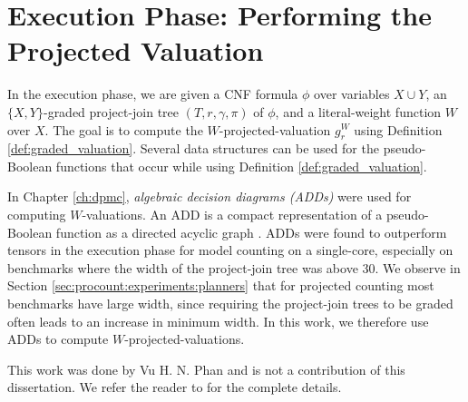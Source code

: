 \section{Execution Phase: Performing the Projected Valuation}
\label{sec:procount:execution}

In the execution phase, we are given a CNF formula $\phi$ over variables $X \cup Y$, an $\{X, Y\}$-graded project-join tree $(T, r, \gamma, \pi)$ of $\phi$, and a literal-weight function $W$ over $X$.
The goal is to compute the $W$-projected-valuation $g^W_r$ using Definition \ref{def:graded_valuation}.
Several data structures can be used for the pseudo-Boolean functions that occur while using Definition \ref{def:graded_valuation}.

In Chapter \ref{ch:dpmc}, \emph{algebraic decision diagrams (ADDs)} were used for computing $W$-valuations.
An ADD is a compact representation of a pseudo-Boolean function as a directed acyclic graph \cite{bahar1997algebraic}.
ADDs were found to outperform tensors in the execution phase for model counting on a single-core, especially on benchmarks where the width of the project-join tree was above 30.
We observe in Section \ref{sec:procount:experiments:planners} that for projected counting most benchmarks have large width, since requiring the project-join trees to be graded often leads to an increase in minimum width.
In this work, we therefore use ADDs to compute $W$-projected-valuations.

This work was done by Vu H. N. Phan and is not a contribution of this dissertation. We refer the reader to \cite{phan2021phd} for the complete details.
